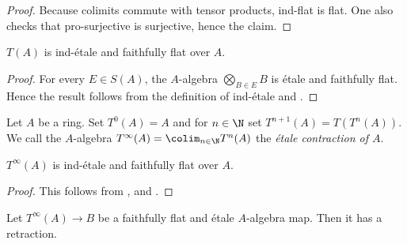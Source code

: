 \begin{proof}
    Because colimits commute with tensor products, ind-flat is flat. One also checks
    that pro-surjective is surjective, hence the claim.
    \leanok
\end{proof}

\begin{lemma}
    $T(A)$ is ind-étale and faithfully flat over $A$.
    \label{lemma:etale-precontraction-ind-etale}
    \leanok
\end{lemma}

\begin{proof}
    \leanok
    For every $E \in S(A)$, the $A$-algebra $\bigotimes_{B \in E} B$ is étale and faithfully flat. Hence
    the result follows from the definition of ind-étale and .
\end{proof}

\begin{definition}
    Let $A$ be a ring. Set $T^0(A) = A$ and for $n \in \N$ set $T^{n+1}(A) = T(T^n(A))$.
    We call the $A$-algebra $T^{\infty}(A) = \colim_{n \in \N} T^n(A)$
    the \emph{étale contraction of $A$}.
    \label{def:etale-contraction}
    \leanok
\end{definition}

\begin{lemma}
    $T^{\infty}(A)$ is ind-étale and faithfully flat over $A$.
    \label{lemma:etale-contraction-ind-etale}
    \leanok
\end{lemma}

\begin{proof}
    \leanok
    This follows from , 
    and .
\end{proof}

\begin{proposition}[{\stacksproject{097R}}]
    Let $T^{\infty}(A) \to B$ be a faithfully flat and étale $A$-algebra map. Then
    it has a retraction.
    \label{prop:etale-contraction-retraction}
    \leanok
\end{proposition}

